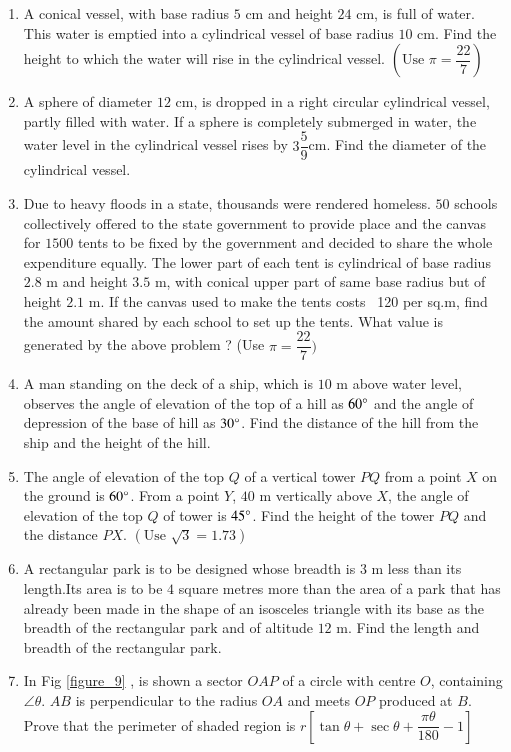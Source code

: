 \documentclass[12pt,-letter paper]{article}
\theoremstyle{remark}
\providecommand{\sbrak}[1]{\ensuremath{{}\left[#1\right]}}
\providecommand{\brak}[1]{\ensuremath{\left(#1\right)}}
\begin{document}
\begin{enumerate}
\begin{figure}[H]
      \caption{}
      \label{figure_8}
\end{figure} 
\item  A conical vessel, with base radius $5$ cm and height $24$ cm, is full of water. This water is emptied into a cylindrical vessel of base radius $10$ cm. Find the height to which the water will rise in the cylindrical vessel. $\brak{\text{Use } \pi  = \dfrac{22}{7}}$\\
\item  A sphere of diameter $12$ cm, is dropped in a right circular cylindrical vessel, partly filled with water. If a sphere is completely submerged in water, the water level in the cylindrical vessel rises by $ 3 \dfrac{5}{9}$cm. Find the diameter of the cylindrical vessel.\\  
\item  Due to heavy floods in a state, thousands were rendered homeless. $50$ schools collectively offered to the state government to provide place and the canvas for $1500$ tents to be fixed by the government and decided to share the whole expenditure equally. The lower part of each tent is cylindrical of base radius $2.8$ m and height $3.5$ m, with conical upper part of same base radius but of height $2.1$ m. If the canvas used to make the tents costs \rupee~120 per sq.m, find the amount shared by each school to set up the tents. What value is generated by the above problem ? (Use $ \pi = \dfrac{22}{7} ) $\\
\item  A man standing on the deck of a ship, which is $10$ m above water level, observes the angle of elevation of the top of a hill as $ 60\degree $ and the angle of depression of the base of hill as $ 30 \degree $. Find the distance of the hill from the ship and the height of the hill.\\
\item The angle of elevation of the top $Q$ of a vertical tower $PQ$ from a point $X$ on the ground is $ 60\degree $. From a point $Y$, $40$ m vertically above $X$, the angle of elevation of the top $Q$ of tower is $ 45 \degree $. Find the height of the tower $PQ$ and the distance $PX$. $\brak{\text{Use }\sqrt{3} = 1.73}$\\
\item A rectangular park is to be designed whose breadth is $3$ m less than its length.Its area is to be $4$ square metres more than the area of a park that has already been made in the shape of an isosceles triangle with its base as the breadth of the rectangular park and of altitude $12$ m. Find the length and breadth of the rectangular park.\\
\item In Fig  \ref{figure_9} , is shown a sector $OAP$ of a circle with centre $O$, containing $\angle \theta$. $AB$ is perpendicular to the radius $OA$ and meets $OP$ produced at $B$. Prove that the perimeter of shaded region is $r\sbrak{\tan \theta + \sec \theta + \dfrac{\pi \theta}{180}-1}$ \\


\end{enumerate}
\end{document}
